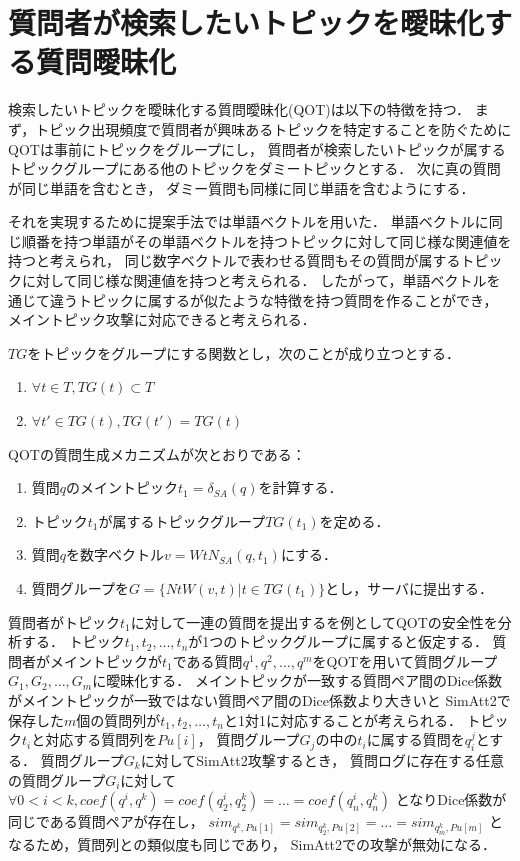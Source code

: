 \documentclass[master]{suribt}
\theoremstyle{definition}
\begin{document}
 \section{質問者が検索したいトピックを曖昧化する質問曖昧化}\label{s:AAAA}
 検索したいトピックを曖昧化する質問曖昧化(QOT)は以下の特徴を持つ．
 まず，トピック出現頻度で質問者が興味あるトピックを特定することを防ぐためにQOTは事前にトピックをグループにし，
 質問者が検索したいトピックが属するトピックグループにある他のトピックをダミートピックとする．
 次に真の質問が同じ単語を含むとき， ダミー質問も同様に同じ単語を含むようにする．

 それを実現するために提案手法では単語ベクトルを用いた．
 単語ベクトルに同じ順番を持つ単語がその単語ベクトルを持つトピックに対して同じ様な関連値を持つと考えられ，
 同じ数字ベクトルで表わせる質問もその質問が属するトピックに対して同じ様な関連値を持つと考えられる．
 したがって，単語ベクトルを通じて違うトピックに属するが似たような特徴を持つ質問を作ることができ，
 メイントピック攻撃に対応できると考えられる．
 
 $TG$をトピックをグループにする関数とし，次のことが成り立つとする．
 \begin{enumerate}
 \renewcommand{\labelenumi}{(\roman{enumi})}
 \item $\forall t \in T,TG(t) \subset T$ 
 \item $\forall t' \in TG(t),TG(t') = TG(t)$
 \end{enumerate}
 
 QOTの質問生成メカニズムが次とおりである：
 \begin{enumerate}
 \renewcommand{\labelenumi}{(\roman{enumi})}
 \item 質問$q$のメイントピック$t_1 = \delta_{SA}(q)$を計算する． 
 \item トピック$t_1$が属するトピックグループ$TG(t_1)$を定める．
 \item 質問$q$を数字ベクトル$v = WtN_{SA}(q,t_1)$にする．
 \item 質問グループを$G = \{NtW(v,t)|t \in TG(t_1)\}$とし，サーバに提出する．
 \end{enumerate}

 質問者がトピック$t_1$に対して一連の質問を提出するを例としてQOTの安全性を分析する．
 トピック$t_1,t_2, \dots ,t_n$が1つのトピックグループに属すると仮定する．
 質問者がメイントピックが$t_1$である質問$q^1,q^2, \dots , q^m$をQOTを用いて質問グループ$G_1,G_2, \dots , G_m$に曖昧化する．
 メイントピックが一致する質問ペア間のDice係数がメイントピックが一致ではない質問ペア間のDice係数より大きいと
 SimAtt2で保存した$m$個の質問列が$t_1,t_2, \dots ,t_n$と1対1に対応することが考えられる．
 トピック$t_i$と対応する質問列を$Pu[i]$，
 質問グループ$G_j$の中の$t_i$に属する質問を$q^j_i$とする．
 質問グループ$G_k$に対してSimAtt2攻撃するとき，
 質問ログに存在する任意の質問グループ$G_i$に対して
 $\forall 0 < i < k, coef(q^i,q^k) = coef(q^i_2,q^k_2) = \dots = coef(q^i_n,q^k_n)$
 となりDice係数が同じである質問ペアが存在し，
 $sim_{q^k,Pu[1]} = sim_{q^k_2,Pu[2]} = \dots = sim_{q^k_m,Pu[m]}$
 となるため，質問列との類似度も同じであり，
 SimAtt2での攻撃が無効になる．
\end{document}
